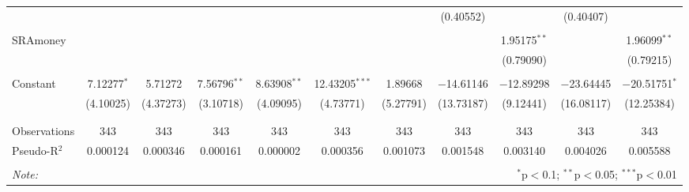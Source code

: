 \documentclass[12pt]{article}
\begin{document}
{\begin{table}[!htbp]
\begin{adjustbox}{width=\textwidth}
\begin{tabular}{@{\extracolsep{5pt}}lcccccccccc}
  &  &  &  &  &  &  & (0.40552) &  & (0.40407) &  \\ 
  & & & & & & & & & & \\ 
 SRAmoney &  &  &  &  &  &  &  & 1.95175$^{**}$ &  & 1.96099$^{**}$ \\ 
  &  &  &  &  &  &  &  & (0.79090) &  & (0.79215) \\ 
  & & & & & & & & & & \\ 
 Constant & 7.12277$^{*}$ & 5.71272 & 7.56796$^{**}$ & 8.63908$^{**}$ & 12.43205$^{***}$ & 1.89668 & $-$14.61146 & $-$12.89298 & $-$23.64445 & $-$20.51751$^{*}$ \\ 
  & (4.10025) & (4.37273) & (3.10718) & (4.09095) & (4.73771) & (5.27791) & (13.73187) & (9.12441) & (16.08117) & (12.25384) \\ 
  & & & & & & & & & & \\ 
\hline \\[-1.8ex] 
Observations & 343 & 343 & 343 & 343 & 343 & 343 & 343 & 343 & 343 & 343 \\ 
Pseudo-R$^{2}$ & 0.000124 & 0.000346 & 0.000161 & 0.000002 & 0.000356 & 0.001073 & 0.001548 & 0.003140 & 0.004026 & 0.005588\\
\hline 
\hline \\[-1.8ex] 
\textit{Note:}  & \multicolumn{10}{r}{$^{*}$p$<$0.1; $^{**}$p$<$0.05; $^{***}$p$<$0.01} \\ 
\end{tabular} 
\end{adjustbox}
\end{table} 





}
\end{document}
